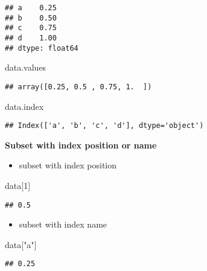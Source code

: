 \documentclass[
]{book}
\newenvironment{Shaded}{\begin{snugshade}}{\end{snugshade}}
\newcommand{\DecValTok}[1]{\textcolor[rgb]{0.00,0.00,0.81}{#1}}
\newcommand{\NormalTok}[1]{#1}
\newcommand{\StringTok}[1]{\textcolor[rgb]{0.31,0.60,0.02}{#1}}
\providecommand{\tightlist}{%
  \setlength{\itemsep}{0pt}\setlength{\parskip}{0pt}}
\begin{document}
\begin{verbatim}
## a    0.25
## b    0.50
## c    0.75
## d    1.00
## dtype: float64
\end{verbatim}

\begin{Shaded}
\begin{Highlighting}[]
\NormalTok{data.values}
\end{Highlighting}
\end{Shaded}

\begin{verbatim}
## array([0.25, 0.5 , 0.75, 1.  ])
\end{verbatim}

\begin{Shaded}
\begin{Highlighting}[]
\NormalTok{data.index}
\end{Highlighting}
\end{Shaded}

\begin{verbatim}
## Index(['a', 'b', 'c', 'd'], dtype='object')
\end{verbatim}

\textbf{Subset with index position or name}

\begin{itemize}
\tightlist
\item
  subset with index position
\end{itemize}

\begin{Shaded}
\begin{Highlighting}[]
\NormalTok{data[}\DecValTok{1}\NormalTok{]}
\end{Highlighting}
\end{Shaded}

\begin{verbatim}
## 0.5
\end{verbatim}

\begin{itemize}
\tightlist
\item
  subset with index name
\end{itemize}

\begin{Shaded}
\begin{Highlighting}[]
\NormalTok{data[}\StringTok{"a"}\NormalTok{]}
\end{Highlighting}
\end{Shaded}

\begin{verbatim}
## 0.25
\end{verbatim}
\end{document}
